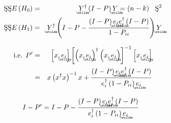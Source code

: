 \documentclass{article}
\begin{document}
\begin{eqnarray*}
\text{\c{S}\c{S}}E\left( H_{0}\right) &=&%
\underaccent{\wtilde}{Y}%
^{\dagger }\left( I-P\right) 
\underaccent{\wtilde}{Y}%
=\left( n-k\right) \text{\c{S}}^{2} \\
\text{\c{S}\c{S}}E\left( H_{1}\right) &=&%
\underaccent{\wtilde}{Y}%
^{\dagger }\left( I-P-\frac{\left( I-P\right) 
\underaccent{\wtilde}{e}%
_{i}%
\underaccent{\wtilde}{e}%
_{i}^{\dagger }\left( I-P\right) }{1-P_{ii}}\right) 
\underaccent{\wtilde}{Y}%
\end{eqnarray*}

\begin{eqnarray*}
\text{i.e. }P^{\prime } &=&\left[ x,%
\underaccent{\wtilde}{e}%
_{i}\right] \left[ \left( x,%
\underaccent{\wtilde}{e}%
_{i}\right) ^{\dagger }\left( x,%
\underaccent{\wtilde}{e}%
_{i}\right) \right] ^{-1}\left[ x,%
\underaccent{\wtilde}{e}%
_{i}\right] \\
&=&x\left( x^{\dagger }x\right) ^{-1}x+\frac{\left( I-P\right) 
\underaccent{\wtilde}{e}%
_{i}%
\underaccent{\wtilde}{e}%
_{i}^{\dagger }\left( I-P\right) }{e_{i}^{\dagger }\left( 1-P_{ii}\right) 
\underaccent{\wtilde}{e}%
_{i}}
\end{eqnarray*}

\begin{equation*}
I-P^{\prime }=I-P-\frac{\left( I-P\right) 
\underaccent{\wtilde}{e}%
_{i}%
\underaccent{\wtilde}{e}%
_{i}^{\dagger }\left( I-P\right) }{e_{i}^{\dagger }\left( 1-P_{ii}\right) 
\underaccent{\wtilde}{e}%
_{i}}
\end{equation*}
\end{document}
